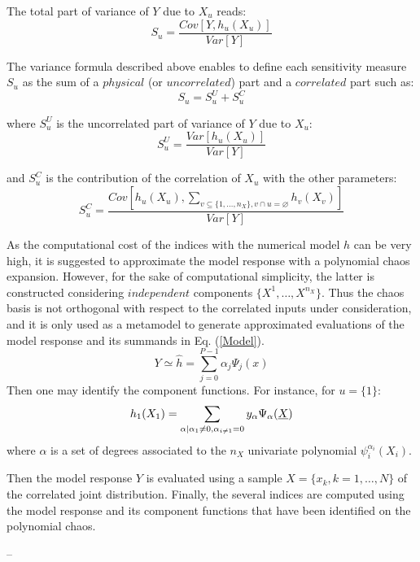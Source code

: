 {  The total part of variance of $Y$ due to $X_u$ reads:
  \begin{displaymath}
    S_u = \frac{Cov[Y, h_u(X_u)]}{Var[Y]}
  \end{displaymath}

  The variance formula described above enables to define each sensitivity measure $S_u$ as the sum of a $\mathit{physical}$ (or $\mathit{uncorrelated}$) part and a $\mathit{correlated}$ part such as:
  \begin{displaymath}
    S_u = S_u^U + S_u^C
  \end{displaymath}

  where $S_u^U$ is the uncorrelated part of variance of $Y$ due to $X_u$:
  \begin{displaymath}
    S_u^U = \frac{Var[h_u(X_u)]}{Var[Y]}
  \end{displaymath}

  and $S_u^C$ is the contribution of the correlation of $X_u$ with the other parameters:
  \begin{displaymath}
    S_u^C = \frac{Cov[h_u(X_u), \displaystyle \sum_{v\subseteq\{1,\dots,n_X\}, v\cap u=\varnothing} h_v(X_v)]}{Var[Y]}
  \end{displaymath}

  As the computational cost of the indices with the numerical model $h$ can be very high, it is suggested to approximate the model response with a polynomial chaos expansion. However, for the sake of computational simplicity, the latter is constructed considering $\mathit{independent}$ components $\{X^1,\dots,X^{n_X}\}$. Thus the chaos basis is not orthogonal with respect to the correlated inputs under consideration, and it is only used as a metamodel to generate approximated evaluations of the model response and its summands in Eq. (\ref{Model}).
  \begin{displaymath}
    Y \simeq \hat{h} = \sum_{j=0}^{P-1} \alpha_j \Psi_j(x)
  \end{displaymath}
  Then one may identify the component functions. For instance, for $u = \{1\}$:
  \begin{displaymath}
    h_1(X_1) = \sum_{\alpha | \alpha_1 \neq 0, \alpha_{i \neq 1} = 0} y_{\alpha} \Psi_{\alpha}({\underline{X}})
  \end{displaymath}
  where $\alpha$ is a set of degrees associated to the $n_X$ univariate polynomial $\psi_i^{\alpha_i}(X_i)$.

  Then the model response $Y$ is evaluated using a sample $X=\{x_k, k=1,\dots,N\}$ of the correlated joint distribution. Finally, the several indices are computed using the model response and its component functions that have been identified on the polynomial chaos.
}
{
  --}

